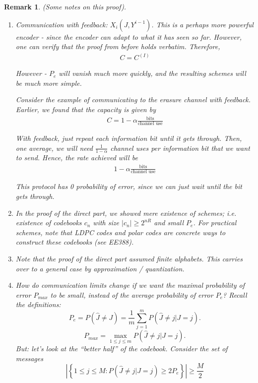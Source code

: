 \documentclass[12pt]{extarticle}
\newtheorem*{remark}{Remark}
\newcommand{\T}{\text}
\begin{document}
\begin{remark} (Some notes on this proof).
  \begin{enumerate}
    \item Communication with feedback: $X_i(J, Y^{i-1})$.  This is a perhaps more powerful encoder - since the encoder can adapt to what it has seen so far.  However, one can verify that the proof from before holds verbatim.  Therefore,
      \begin{align*}
        C = C^{(I)} \tag{with or without feedback}
      \end{align*}

      However - $P_e$ will vanish much more quickly, and the resulting schemes will be much more simple.

      Consider the example of communicating to the erasure channel with feedback.  Earlier, we found that the capacity is given by
      \begin{align*}
        C = 1 - \alpha \frac{\T{bits}}{\T{channel use}}
      \end{align*}

      With feedback, just repeat each information bit until it gets through.  Then, one average, we will need $\frac{1}{1 - \alpha}$ channel uses per information bit that we want to send.  Hence, the rate achieved will be
      \begin{align*}
        1 - \alpha \frac{\T{bits}}{\T{channel use}}
      \end{align*}

      This protocol has 0 probability of error, since we can just wait until the bit gets through.

    \item In the proof of the direct part, we showed mere existence of schemes; i.e. existence of codebooks $c_n$ with size $|c_n| \geq 2^{nR}$ and small $P_e$.  For practical schemes, note that LDPC codes and polar codes are concrete ways to construct these codebooks (see EE388).

    \item Note that the proof of the direct part assumed finite alphabets.  This carries over to a general case by approximation / quantization.

    \item How do communication limits change if we want the maximal probability of error $P_{max}$ to be small, instead of the average probability of error $P_e$?  Recall the definitions:
      \[
        P_e = P(\hat{J} \neq J) = \frac{1}{m} \sum_{j=1}^{m} P(\hat{J} \neq j | J = j).
      \]
      \[
        P_{max} = \max_{1 \leq j \leq m} P(\hat{J} \neq j | J = j).
      \]
      But: let's look at the ``better half'' of the codebook.  Consider the set of messages 
      \[
        | \left\{ 1 \leq j \leq M: P(\hat{J} \neq j | J = j) \geq 2 P_e \right\} | \geq \frac{M}{2} \tag{by Markov's inequality}
      \]


\end{enumerate}
\end{remark}
\end{document}
